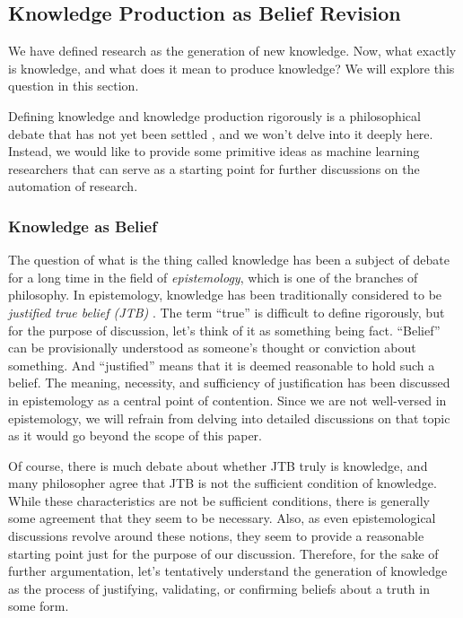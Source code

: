 \documentclass{book}
\begin{document}
\subsection{Knowledge Production as Belief Revision}
We have defined research as the generation of new knowledge. Now, what exactly is knowledge, and what does it mean to produce knowledge? We will explore this question in this section. 

Defining knowledge and knowledge production rigorously is a philosophical debate that has not yet been settled \cite{sep-epistemology}, and we won't delve into it deeply here. Instead, we would like to provide some primitive ideas as machine learning researchers that can serve as a starting point for further discussions on the automation of research.

\subsubsection{Knowledge as Belief}
The question of what is the thing called knowledge has been a subject of debate for a long time in the field of \textit{epistemology}, which is one of the branches of philosophy. In epistemology, knowledge has been traditionally considered to be \textit{justified true belief (JTB)} \cite{sep-epistemology}. The term ``true'' is difficult to define rigorously, but for the purpose of discussion, let's think of it as something being fact. ``Belief'' can be provisionally understood as someone's thought or conviction about something. And ``justified'' means that it is deemed reasonable to hold such a belief. The meaning, necessity, and sufficiency of justification has been discussed in epistemology as a central point of contention. Since we are not well-versed in epistemology, we will refrain from delving into detailed discussions on that topic as it would go beyond the scope of this paper.

Of course, there is much debate about whether JTB truly is knowledge, and many philosopher agree that JTB is not the sufficient condition of knowledge. While these characteristics are not be sufficient conditions, there is generally some agreement that they seem to be necessary. Also, as even epistemological discussions revolve around these notions, they seem to provide a reasonable starting point just for the purpose of our discussion. Therefore, for the sake of further argumentation, let's tentatively understand the generation of knowledge as the process of justifying, validating, or confirming beliefs about a truth in some form.
\end{document}
